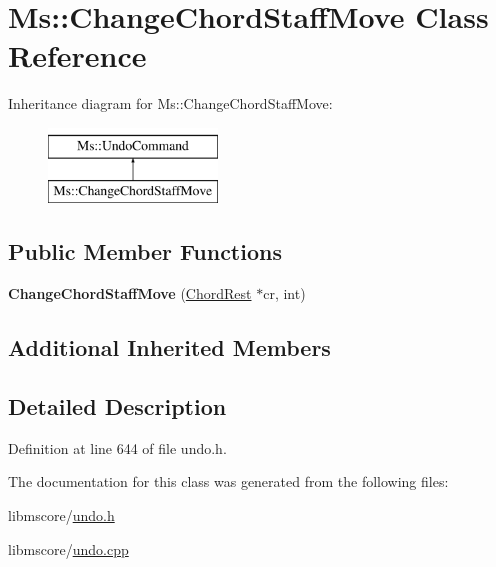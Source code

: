 \hypertarget{class_ms_1_1_change_chord_staff_move}{}\section{Ms\+:\+:Change\+Chord\+Staff\+Move Class Reference}
\label{class_ms_1_1_change_chord_staff_move}
Inheritance diagram for Ms\+:\+:Change\+Chord\+Staff\+Move\+:\begin{figure}[H]
\begin{center}
\leavevmode
\includegraphics[height=2.000000cm]{class_ms_1_1_change_chord_staff_move}
\end{center}
\end{figure}
\subsection*{Public Member Functions}
\begin{DoxyCompactItemize}
\item 
\mbox{\label{class_ms_1_1_change_chord_staff_move_a6380865971cfc64720def9427c4d1931}} 
{\bfseries Change\+Chord\+Staff\+Move} (\hyperlink{class_ms_1_1_chord_rest}{Chord\+Rest} $\ast$cr, int)
\end{DoxyCompactItemize}
\subsection*{Additional Inherited Members}


\subsection{Detailed Description}


Definition at line 644 of file undo.\+h.



The documentation for this class was generated from the following files\+:\begin{DoxyCompactItemize}
\item 
libmscore/\hyperlink{undo_8h}{undo.\+h}\item 
libmscore/\hyperlink{undo_8cpp}{undo.\+cpp}\end{DoxyCompactItemize}
